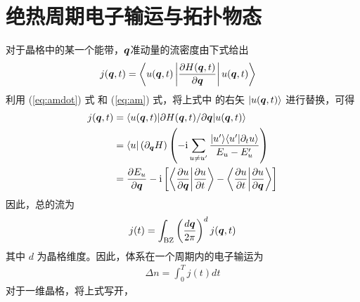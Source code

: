 \section{绝热周期电子输运与拓扑物态}\label{sec:topocp}
对于晶格中的某一个能带，$\boldsymbol{q}$准动量的流密度由下式给出
\begin{align}
j(\boldsymbol{q}, t) &= \left\langle u(\boldsymbol{q}, t)\left|\dfrac{\partial H(\boldsymbol{q}, t)}{\partial\boldsymbol{q}} \right|u(\boldsymbol{q}, t)\right\rangle
\end{align}
利用 (\ref{eq:amdot}) 式 和 (\ref{eq:am}) 式，将上式中 的右矢 $|u(\boldsymbol{q}, t)\rangle$ 进行替换，可得
\begin{align}
j(\boldsymbol{q}, t)
&= \langle u(\boldsymbol{q},t)|\partial H(\boldsymbol{q},t)/\partial\boldsymbol{q}|u(\boldsymbol{q},t)\rangle \\
&= \langle u|\left(\partial_{\boldsymbol{q}} H\right) \left(-\mathrm{i}\sum_{u\neq u'}\dfrac{|u'\rangle\langle u'|\partial_t u\rangle}{E_u - E_u'}\right) \\
&= \dfrac{\partial E_u}{\partial\boldsymbol{q}} - \mathrm{i}\left[\left\langle\dfrac{\partial u}{\partial \boldsymbol{q}}\bigg|\dfrac{\partial u}{\partial t}\right\rangle - \left\langle\dfrac{\partial u}{\partial t}\bigg|\dfrac{\partial u}{\partial \boldsymbol{q}}\right\rangle\right]
\end{align}
因此，总的流为
\begin{align}
j(t) = \int_{\text{BZ}}\left(\frac{d\boldsymbol{q}}{2\pi}\right)^{d} j(\boldsymbol{q}, t)
\end{align}
其中 $d$ 为晶格维度。因此，体系在一个周期内的电子输运为
\begin{align}
\Delta n = \int_0^Tj(t)dt
\end{align}
对于一维晶格，将上式写开，
